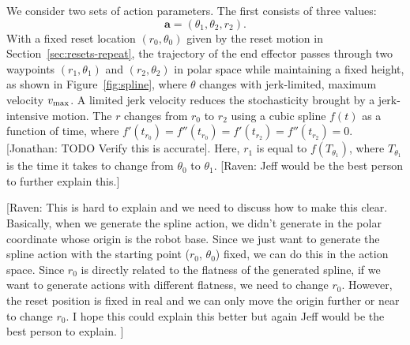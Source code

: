 \documentclass[letterpaper, 10 pt, conference]{ieeeconf}  %
\newcommand{\ba}{\mathbf{a}}
\newcommand{\vmax}{v_{\rm max}}
\newcommand{\remark}[3]{{\color{#2}[#1: #3]}}
\newcommand{\jonathan}[1]{\remark{Jonathan}{cyan}{#1}}
\newcommand{\raven}[1]{\remark{Raven}{britishracinggreen}{#1}}
\begin{document}
We consider two sets of action parameters. The first consists of three values:
\begin{equation}\label{eq:act2}
    \ba = (\theta_1, \theta_2, r_2).
\end{equation}
With a fixed reset location $(r_0, \theta_0)$ given by the reset motion in Section~\ref{sec:resets-repeat}, the trajectory of the end effector passes through two waypoints $(r_1, \theta_1)$ and $(r_2, \theta_2)$ in polar space while maintaining a fixed height, as shown in Figure~\ref{fig:spline}, where $\theta$ changes with jerk-limited, maximum velocity $\vmax$. A limited jerk velocity reduces the stochasticity brought by a jerk-intensive motion. The $r$ changes from $r_0$ to $r_2$ using a cubic spline $f(t)$ as a function of time, where $f'(t_{r_0}) = f''(t_{r_0}) = f'(t_{r_2}) = f''(t_{r_2}) = 0$. \jonathan{TODO Verify this is accurate}. Here, $r_1$ is equal to $f(T_{\theta_1})$, where $T_{\theta_1}$ is the time it takes to change from $\theta_0$ to $\theta_1$. \raven{Jeff would be the best person to further explain this.}

\raven{This is hard to explain and we need to discuss how to make this clear. Basically, when we generate the spline action, we didn't generate in the polar coordinate whose origin is the robot base. Since we just want to generate the spline action with the starting point ($r_0$, $\theta_0$) fixed, we can do this in the action space. Since $r_0$ is directly related to the flatness of the generated spline, if we want to generate actions with different flatness, we need to change $r_0$. However, the reset position is fixed in real and we can only move the origin further or near to change $r_0$. I hope this could explain this better but again Jeff would be the best person to explain. }

\end{document}
